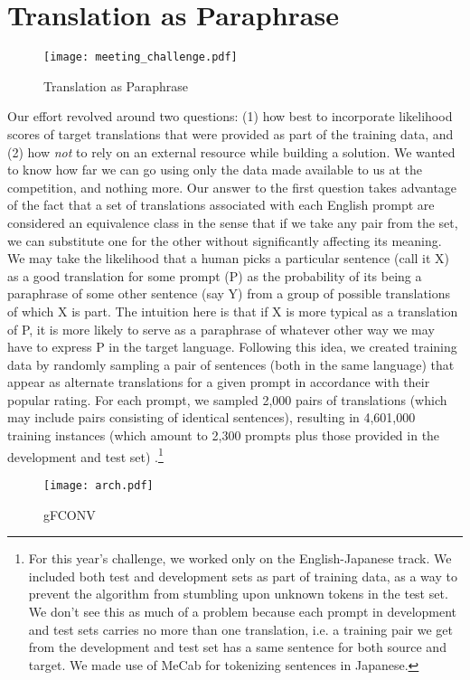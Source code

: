 \documentclass[dvipdfmx,11pt,a4paper]{article}
\begin{document}
\section{Translation as Paraphrase}
 \begin{figure}
\texttt{[image: meeting\_challenge.pdf]}
\caption{Translation as Paraphrase \label{fig:model}}
\end{figure}
Our effort revolved around  two questions: (1)  how best to incorporate likelihood scores of target translations that were provided as part of the training data, and (2) how {\em not} to rely on an external resource while building a solution. We wanted to know how far we can go using only the data made available to us at the competition, and nothing more. Our answer to the first question takes advantage of the fact that a set of translations associated with each  English prompt  are considered an equivalence class in the sense that if we take any pair from the set, we can substitute one for the other without significantly affecting its  meaning. We may take the likelihood that a human picks a particular sentence (call it X)  as a good translation for some prompt (P) as the probability of its being a paraphrase of some other sentence (say Y) from a group of possible translations of which X is part. The intuition here is that  if X is more typical as a translation of P,  it is  more likely to serve as a paraphrase of whatever other way we may have to express  P in the target language. Following this idea, we created training data by randomly sampling a pair of sentences (both in the same language) that appear as alternate translations for a given prompt in accordance with their popular rating.  For each prompt, we sampled 2,000 pairs of translations (which may include pairs consisting of identical sentences), resulting in  4,601,000 training instances (which amount to 2,300 prompts plus those provided in the development and test set) \cite{staple20}.\footnote{ For this year's challenge, we worked only on the  English-Japanese track. We included both test and development sets as part of training data, as a way to prevent the algorithm from stumbling upon unknown tokens in the test set.  We don't see this as much of a problem because each prompt in development and test sets carries no more than one translation, i.e.  a training pair we get  from the development and test set  has a same sentence for both source and target. We made use of MeCab for tokenizing sentences in Japanese.} 
\begin{figure}
\texttt{[image: arch.pdf]}
\caption{gFCONV\label{fig:arch}}
\end{figure}
\end{document}
